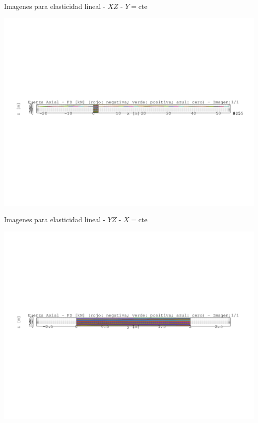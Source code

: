 \documentclass[a4paper,11pt]{article}
\begin{document}
\begin{center}       
Imagenes para elasticidad lineal -  $XZ$ - $Y=\text{cte}$ 

\includegraphics[width=.80\textwidth]{../../XY_XZ_YZ/XZ/fuerza_axial/grua_fuerza_axial_XZ_1.png}      

\end{center}       
\newpage       
\begin{center}       
Imagenes para elasticidad lineal -  $YZ$ - $X=\text{cte}$ 

\includegraphics[width=.80\textwidth]{../../XY_XZ_YZ/YZ/fuerza_axial/grua_fuerza_axial_YZ_1.png}      

\end{center}       
\end{document}
